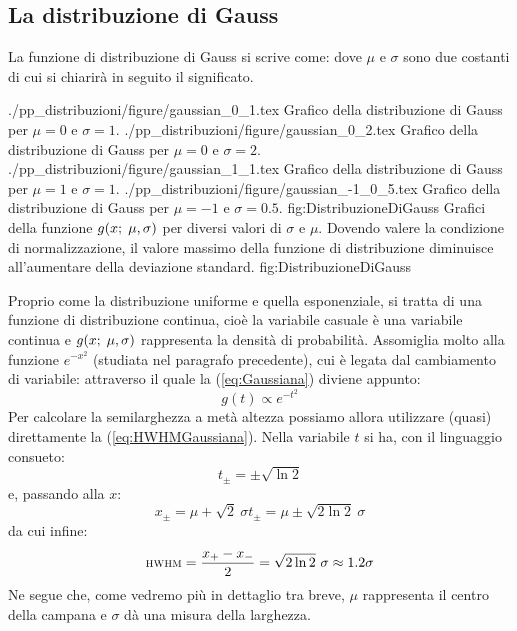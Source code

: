 
\subsection{La distribuzione di Gauss}

 La funzione di distribuzione di Gauss si scrive
come:
dove $\mu$ e $\sigma$ sono due costanti di cui si chiarir\`a in seguito il
significato.

\panelfig
{\twobytwotexfig
{./pp_distribuzioni/figure/gaussian_0_1.tex}
{Grafico della distribuzione di Gauss per $\mu=0$ e $\sigma=1$.}
{./pp_distribuzioni/figure/gaussian_0_2.tex}
{Grafico della distribuzione di Gauss per $\mu=0$ e $\sigma=2$.}
{./pp_distribuzioni/figure/gaussian_1_1.tex}
{Grafico della distribuzione di Gauss per $\mu=1$ e $\sigma=1$.}
{./pp_distribuzioni/figure/gaussian_-1_0_5.tex}
{Grafico della distribuzione di Gauss per $\mu=-1$ e $\sigma=0.5$.}
{fig:DistribuzioneDiGauss}}
{Grafici della funzione $g(x; \; \mu, \sigma)$ per diversi valori
di $\sigma$ e $\mu$. Dovendo valere la condizione di normalizzazione, il
valore massimo della funzione di distribuzione diminuisce all'aumentare
della deviazione standard.}
{fig:DistribuzioneDiGauss}

Proprio come la distribuzione uniforme e quella esponenziale, si tratta
di una funzione di distribuzione continua, cio\`e la variabile casuale \`e
una variabile continua e $g(x; \; \mu, \sigma)$
rappresenta la densit\`a di
probabilit\`a. Assomiglia molto alla funzione $e^{-x^2}$ (studiata nel
paragrafo precedente), cui \`e legata dal cambiamento di variabile:
attraverso il quale la (\ref{eq:Gaussiana}) diviene appunto:
$$
g(t) \propto e^{-t^2}
$$
Per calcolare la semilarghezza a met\`a altezza
 possiamo allora utilizzare
(quasi) direttamente la (\ref{eq:HWHMGaussiana}). Nella variabile $t$ si ha,
con il linguaggio consueto:
$$
t_{\pm} = \pm \sqrt{\ln 2}
$$
e, passando alla $x$:
$$
x_{\pm} = \mu + \sqrt{2}~\sigma t_{\pm} = \mu \pm \sqrt{2 \ln 2} ~ \sigma
$$
da cui infine:
$$
{\scriptstyle \textsc{HWHM}} = \frac{x_+ - x_-}{2} = \sqrt{2 \ln 2} ~ \sigma \approx 1.2\sigma
$$
Ne segue che, come vedremo pi\`u in dettaglio tra breve, $\mu$ rappresenta
il centro della campana e $\sigma$ d\`a una misura della larghezza.

